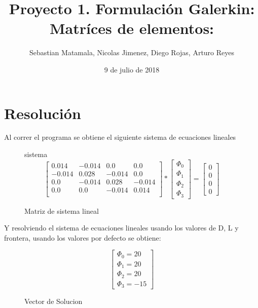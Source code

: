\documentclass{article}
\title{Proyecto 1. Formulación Galerkin: Matríces de elementos: }
\author{Sebastian Matamala, Nicolas Jimenez, Diego Rojas, Arturo Reyes}
\date{9 de julio de 2018}
\begin{document}
\maketitle


\newpage


\section{Resolución}

Al correr el programa se obtiene el siguiente sistema de ecuaciones lineales

\begin{figure}[!ht]{sistema}
    \centering
    \[
    \begin{bmatrix}
        {0.014} & {-0.014} & {0.0} & {0.0}\\
        {-0.014} & {0.028} & {-0.014} & {0.0}\\
        {0.0} & {-0.014} & {0.028} & {-0.014}\\
        {0.0} & {0.0} & {-0.014} & {0.014}\\
    \end{bmatrix}
    *
    \begin{bmatrix}
        {\Phi_0}\\
        {\Phi_1}\\
        {\Phi_2}\\
        {\Phi_3}
    \end{bmatrix}
    =
    \begin{bmatrix}
        {0}\\
        {0}\\
        {0}\\
        {0}
    \end{bmatrix}
    \]
    \caption{Matriz de sistema lineal}

\end{figure}
Y resolviendo el sistema de ecuaciones lineales usando los valores de D, L y frontera, usando los valores por defecto se obtiene:
\begin{figure}[!h]
    
    \[
        \begin{bmatrix}
            {\Phi_0 = 20}\\
            {\Phi_1 = 20}\\
            {\Phi_2 = 20}\\
            {\Phi_3 = -15}
        \end{bmatrix}
    \]
    \caption{Vector de Solucion}
\end{figure}
\end{document}
